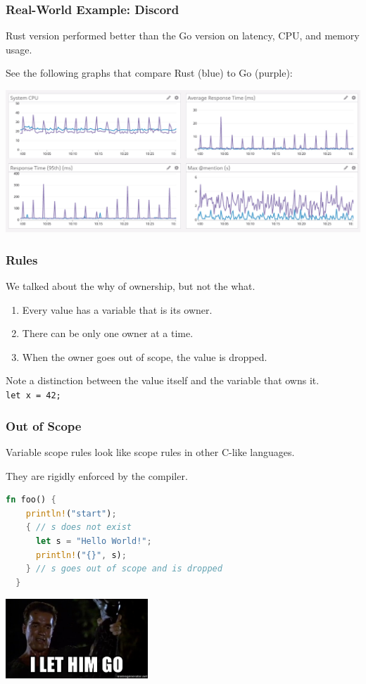 \begin{frame}
\frametitle{Real-World Example: Discord}

Rust version performed better than the Go version on latency, CPU, and memory usage.

See the following graphs that compare Rust (blue) to Go (purple): 
\begin{center}
\includegraphics[width=\textwidth]{images/rust-vs-go.png}
\end{center}

\end{frame}


\begin{frame}
\frametitle{Rules}

We talked about the why of ownership, but not the what.

\begin{enumerate}
	\item Every value has a variable that is its owner.
	\item There can be only one owner at a time.
	\item When the owner goes out of scope, the value is dropped.
\end{enumerate}

Note a distinction between the value itself and the variable that owns it.\\
\quad \texttt{let x = 42;}

\end{frame}


\begin{frame}[fragile]
\frametitle{Out of Scope}

Variable scope rules look like scope rules in other C-like languages.

They are rigidly enforced by the compiler.

\begin{lstlisting}[language=Rust]
  fn foo() {
    println!("start");
    { // s does not exist
      let s = "Hello World!";
      println!("{}", s);
    } // s goes out of scope and is dropped
  }
\end{lstlisting}


\begin{center}
	\includegraphics[width=0.4\textwidth]{images/i-let-him-go.jpg}
\end{center}

\end{frame}


